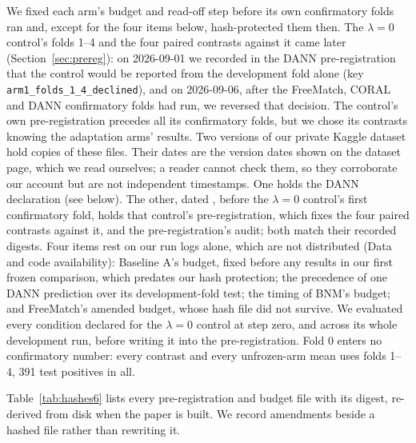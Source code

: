 We fixed each arm's budget and read-off step before its own confirmatory folds ran and, except
for the four items below, hash-protected them then. The $\lambda=0$ control's folds 1--4 and the
four paired contrasts against it came later (Section~\ref{sec:prereg}): on 2026-09-01 we recorded
in the DANN pre-registration that the control would be reported from the development fold alone
(key \texttt{arm1\_folds\_1\_4\_declined}), and on 2026-09-06, after the FreeMatch, CORAL and
DANN confirmatory folds had run, we reversed that decision. The control's own pre-registration
precedes all its confirmatory folds, but we chose its contrasts knowing the adaptation arms'
results.
Two versions of our private Kaggle dataset hold copies of these files. Their dates are the
version dates shown on the dataset page, which we read ourselves; a reader cannot check them, so
they corroborate our account but are not independent timestamps. One holds the DANN declaration
(see below). The other, dated \lambdaKaggleDate{}, before the $\lambda = 0$ control's first
confirmatory fold, holds that control's pre-registration, which fixes the four paired contrasts
against it, and the pre-registration's audit; both match their recorded digests. Four items rest on our run logs alone, which are not distributed (Data and code
availability): Baseline A's budget, fixed
before any results in our first frozen comparison, which predates our hash protection; the
precedence of one DANN prediction over its development-fold test; the timing of BNM's budget;
and FreeMatch's amended budget, whose hash file did not survive. We evaluated every condition
declared for the $\lambda=0$ control at step zero, and across its whole development run, before
writing it into the pre-registration. Fold 0 enters no confirmatory number: every contrast and
every unfrozen-arm mean uses folds 1--4, 391 test positives in all.

Table~\ref{tab:hashes6} lists every pre-registration and budget file with its digest, re-derived
from disk when the paper is built. We record amendments beside a hashed file rather than
rewriting it.



